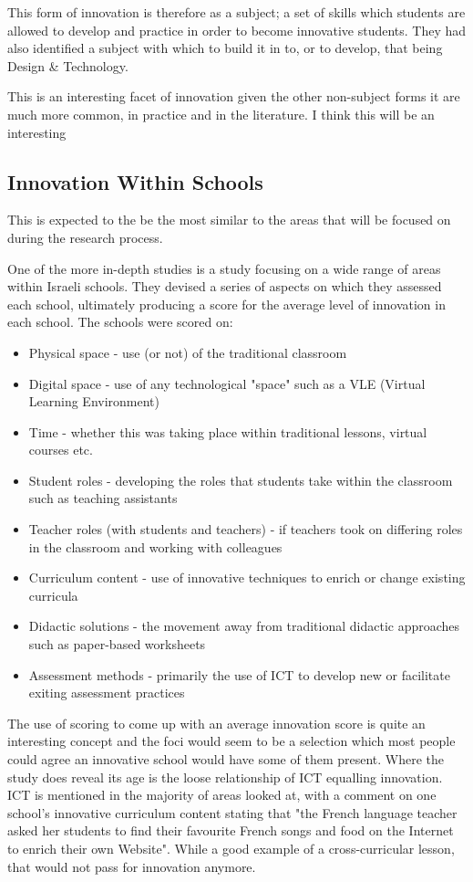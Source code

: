 This form of innovation is therefore as a subject; a set of skills which students are allowed to develop and practice in order to become innovative students. They had also identified a subject with which to build it in to, or to develop, that being Design & Technology.

This is an interesting facet of innovation given the other non-subject forms it are much more common, in practice and in the literature. I think this will be an interesting 

\subsection{Innovation Within Schools}
This is expected to the be the most similar to the areas that will be focused on during the research process.

One of the more in-depth studies is a study focusing on a wide range of areas within Israeli schools. \cite{tubin2003domains} They devised a series of aspects on which they assessed each school, ultimately producing a score for the average level of innovation in each school. The schools were scored on:

\begin{itemize}
\item Physical space - use (or not) of the traditional classroom
\item Digital space - use of any technological "space" such as a VLE (Virtual Learning Environment)
\item Time - whether this was taking place within traditional lessons, virtual courses etc.
\item Student roles - developing the roles that students take within the classroom such as teaching assistants
\item Teacher roles (with students and teachers) - if teachers took on differing roles in the classroom and working with colleagues
\item Curriculum content - use of innovative techniques to enrich or change existing curricula
\item Didactic solutions - the movement away from traditional didactic approaches such as paper-based worksheets
\item Assessment methods - primarily the use of ICT to develop new or facilitate exiting assessment practices
\end{itemize}

The use of scoring to come up with an average innovation score is quite an interesting concept and the foci would seem to be a selection which most people could agree an innovative school would have some of them present. Where the study does reveal its age is the loose relationship of ICT equalling innovation. ICT is mentioned in the majority of areas looked at, with a comment on one school's innovative curriculum content stating that "the French language teacher asked her students to find their favourite French songs and food on the Internet to enrich their own Website". While a good example of a cross-curricular lesson, that would not pass for innovation anymore.

